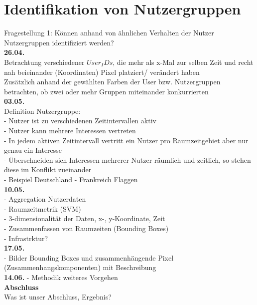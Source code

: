 \section{Identifikation von Nutzergruppen} \label{question1}  %

Fragestellung 1: K{\"o}nnen anhand von {\"a}hnlichen Verhalten der Nutzer Nutzergruppen identifiziert werden?\\

\textbf{26.04.}\\
Betrachtung verschiedener $User_IDs$, die mehr als x-Mal zur selben Zeit und recht nah beieinander (Koordinaten) Pixel platziert/ ver{\"a}ndert haben\\
Zusätzlich anhand der gew{\"a}hlten Farben der User bzw. Nutzergruppen betrachten, ob zwei oder mehr Gruppen miteinander konkurrierten\\
\textbf{03.05.}\\
Definition Nutzergruppe:\\
- Nutzer ist zu verschiedenen Zeitintervallen aktiv\\
- Nutzer kann mehrere Interessen vertreten\\
- In jedem aktiven Zeitintervall vertritt ein Nutzer pro Raumzeitgebiet aber nur genau ein Interesse\\
- {\"U}berschneiden sich Interessen mehrerer Nutzer r{\"a}umlich und zeitlich, so stehen diese im Konflikt zueinander\\
- Beispiel Deutschland - Frankreich Flaggen\\
\textbf{10.05.}\\
- Aggregation Nutzerdaten\\
- Raumzeitmetrik (SVM)\\
- 3-dimensionalit{\"a}t der Daten, x-, y-Koordinate, Zeit\\
- Zusammenfassen von Raumzeiten (Bounding Boxes)\\
- Infrastrktur?\\
\textbf{17.05.}\\
- Bilder Bounding Boxes und zusammenh{\"a}ngende Pixel (Zusammenhangskomponenten) mit Beschreibung\\

\textbf{14.06.}
- Methodik weiteres Vorgehen\\

\textbf{Abschluss}\\
Was ist unser Abschluss, Ergebnis?


